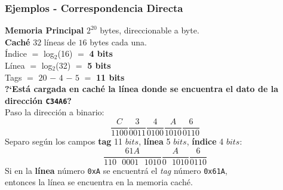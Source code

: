 \documentclass[aspectratio=169]{beamer}
\begin{document}
\begin{frame}[t]
    \frametitle{Ejemplos - Correspondencia Directa}
    \small 
    \textbf{Memoria Principal} $2^{20}$ bytes, direccionable a byte.\\
    \textbf{Caché}  $32$ l\'ineas de $16$ bytes cada una.\\
    \bigskip
    \textcolor{naranjauca}{Índice} $=$ log$_2$(16) $=$ \textbf{4 bits}\\
    \textcolor{naranjauca}{Línea} $=$ log$_2$(32) $=$ \textbf{5 bits}\\
    \textcolor{naranjauca}{Tags} $=$ $20$ $-$ $4$ $-$ $5$ $=$ \textbf{11 bits}\\
    \bigskip
    \textbf{?`Está cargada en caché la línea donde se encuentra el dato de la direcci\'on \texttt{C34A6}?}\\
    \vskip 5pt
    \small
    Paso la dirección a binario:\\
    \vskip -15pt
    \begin{equation*}
    \text{}\frac{C}{1100} \frac{3}{0011} \frac{4}{0100} \frac{A}{1010} \frac{6}{0110}
    \end{equation*}
    Separo seg\'un los campos \textbf{tag} 11 $bits$, \textbf{l\'inea} 5 $bits$, \textbf{\'indice} 4 $bits$:\\
    \vskip -5pt
    \begin{equation*}
    \text{}\frac{61A}{110\text{ }0001\text{ }1010} \frac{A}{0\text{ }1010} \frac{6}{0110}
    \end{equation*}
    Si en la \textbf{línea} número \texttt{0xA} se encuentrá el \emph{tag} n\'umero \texttt{0x61A},\\
    entonces la línea se encuentra en la memoria caché.
\end{frame}
\end{document}
